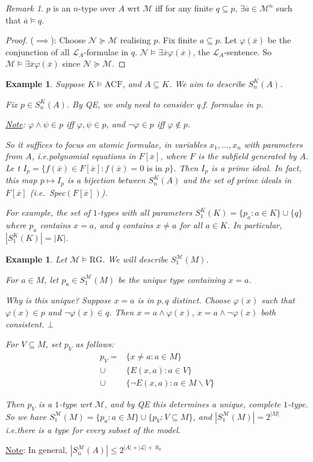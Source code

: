 \documentclass[]{article}
\theoremstyle{custhm}
\theoremstyle{cusdef}
\theoremstyle{custhm}
\theoremstyle{custhm}
\theoremstyle{custhm}
\theoremstyle{ex}
\newtheorem{ex}[theorem]{Example}
\theoremstyle{custhm}
\theoremstyle{cusdef}
\theoremstyle{remark}
\theoremstyle{remark}
\theoremstyle{numremark}
\newtheorem{numremark}[theorem]{Remark}
\newcommand{\ie}{\textit{i.e.}}
\renewcommand{\L}{\mathcal{L}}
\newcommand{\M}{\mathcal{M}}
\renewcommand{\phi}{\varphi}
\renewcommand{\bar}{\overline}
\newcommand{\false}{\bot}
\newcommand{\N}{\mathcal{N}}
\newcommand{\acf}{\textrm{ACF}}
\newcommand{\rg}{\textrm{RG}}
\renewcommand{\subset}{\subseteq}
\begin{document}
\begin{numremark}
	$p$ is an $n$-type over $A$ wrt $\M$ iff for any finite $q \subset p$, $\exists \bar{a}\in \M^n$ such that $\bar{a}\models q$.
\end{numremark}
\begin{proof}
($\implies$): Choose $\N\succeq \M$ realising $p$. Fix finite $a \subset p$. Let $\phi(\bar{x})$ be the conjunction of all $\L_A$-formulae in $q$. $\N\models \exists \bar{x}\phi(\bar{x})$, the $\L_A$-sentence. So $\M\models \exists \bar{x}\phi(\bar{x})$ since $\N\succeq \M$.
\end{proof}

\begin{ex}
Suppose $K\models \acf$, and $A\subset K$. We aim to describe $S_n^K(A)$.

Fix $p \in S_n^K(A)$. By QE, we only need to consider q.f. formulae in $p$.

\underline{Note}: $\phi\land \psi \in p$ iff $\phi,\psi \in p$, and $\neg \phi \in p$ iff $\phi \not\in p$.

So it suffices to focus on atomic formulae, in variables $x_1,\dots,x_n$ with parameters from $A$, \ie polynomial equations in $F[\bar{x}]$, where $F$ is the subfield generated by $A$. Le t $I_p = \{f(\bar{x})\in F[\bar{x}]:f(\bar{x}) = 0\textrm{ is in }p\}$. Then $I_p$ is a prime ideal. In fact, this map $p\mapsto I_p$ is a bijection between $S_n^K(A)$ and the set of prime ideals in $F[\bar{x}]$ (\ie\ Spec$(F[\bar{x}])$).

For example, the set of $1$-types with all parameters $S_1^K(K) = \{p_a:a\in K\}\cup\{q\}$ where $p_a$ contains $x = a$, and $q$ contains $x\ne a$ for all $a \in K$. In particular, $|S_1^K(K)| = |K|$.
\end{ex}
\begin{ex}
Let $\M\models \rg$. We will describe $S_1^\M(M)$.

For $a\in M$, let $p_a\in S_1^\M(M)$ be the unique type containing $x = a$.

Why is this unique? Suppose $x = a$ is in $p,q$ distinct. Choose $\phi(x)$ such that $\phi(x) \in p$ and $\neg\phi(x)\in q$. Then $x =a \land \phi(x)$, $x = a \land \neg\phi(x)$ both consistent. $\false$

For $V\subset M$, set $p_V$ as follows:
\begin{align*}
p_V =& \{x\ne a: a\in M\}\\
\cup&\{E(x,a):a\in V\}\\
\cup&\{\neg E(x,a):a\in M\backslash V\}
\end{align*}

Then $p_V$ is a $1$-type wrt $\M$, and by QE this determines a unique, complete $1$-type. So we have $S_1^\M(M) = \{p_a:a\in M\}\cup\{p_V:V\subset M\}$, and $|S_1^\M(M)| = 2^{|M|}$ \ie there is a type for every subset of the model.
\end{ex}
\underline{Note}: In general, $|S_n^\M(A)| \le 2^{|A| + |\L| + \aleph_0}$
\end{document}
